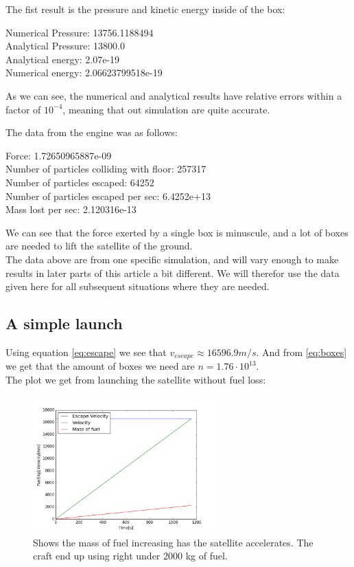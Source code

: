 \documentclass[a4paper, 10pt]{article}
\begin{document}
The fist result is the pressure and kinetic energy inside of the box:
\begin{tcolorbox}
Numerical Pressure:  13756.1188494 \\
Analytical Pressure:  13800.0 \\
Analytical energy:  2.07e-19 \\
Numerical energy:  2.06623799518e-19 
\end{tcolorbox}

As we can see, the numerical and analytical results have relative errors within a factor of $10^{-4}$, meaning that out simulation are quite accurate.

The data from the engine was as follows:

\begin{tcolorbox}
Force:  1.72650965887e-09 \\
Number of particles colliding with floor:  257317 \\
Number of particles escaped:  64252 \\
Number of particles escaped per sec:  6.4252e+13 \\
Mass lost per sec:  2.120316e-13
\end{tcolorbox}

We can see that the force exerted by a single box is minuscule, and a lot of boxes are needed to lift the satellite of the ground. \\

The data above are from one specific simulation, and will vary enough to make results in later parts of this article a bit different. We will therefor use the data given here for all subsequent situations where they are needed.

\subsection{A simple launch}

Using equation \ref{eq:escape} we see that $v_{escape} \approx 16596.9 m/s$. And from \ref{eq:boxes} we get that the amount of boxes we need are $n = 1.76 \cdot 10^{13}$. \\

The plot we get from launching the satellite without fuel loss:


\begin{figure}[H]
\begin{center}
\includegraphics[width = 70mm]{part1launchConstMass.png}
\caption{Shows the mass of fuel increasing has the satellite accelerates. The craft end up using right under 2000 kg of fuel.}
\end{center}
\end{figure}
\end{document}
